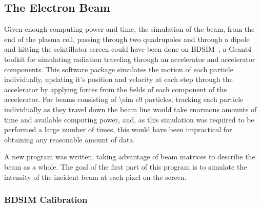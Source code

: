 \subsection{The Electron Beam}


Given enough computing power and time, the simulation of the beam, from the end
of the plasma cell, passing through two quadrupoles and through a dipole and
hitting the scintillator screen could have been done on
BDSIM~\cite{agapov2009bdsim}, a Geant4~\cite{agostinelli2003geant4} toolkit for
simulating radiation traveling through an accelerator and accelerator
components. This software package simulates the motion of each particle
individually, updating it's position and velocity at each step through the
accelerator by applying forces from the fields of each component of the
accelerator. For beams consisting of \num{\sim e9} particles, tracking each
particle individually as they travel down the beam line would take enormous
amounts of time and available computing power, and, as this simulation was
required to be performed a large number of times, this would have been
impractical for obtaining any reasonable amount of data.

A new program was written, taking advantage of beam matrices to describe the
beam as a whole. The goal of the first part of this program is to simulate the
intensity of the incident beam at each pixel on the screen.

\subsubsection{BDSIM Calibration}

